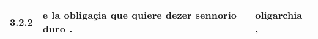 \begin{tabular}{|p{1cm}|p{6.5cm}|p{6.5cm}|}

\hline
3.2.2 & e la obligaçia que quiere dezer sennorio duro . & oligarchia , \\\hline

\end{tabular}
